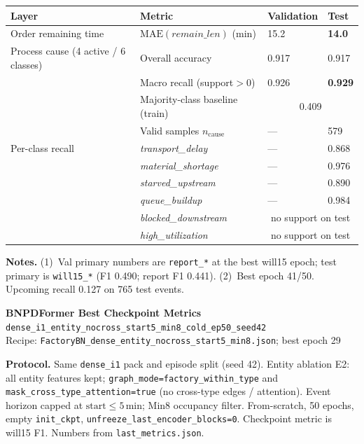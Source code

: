 \documentclass[10pt,a4paper]{article}
\begin{document}
\begin{center}
\begin{tabular}{l l l l}
\toprule
Layer & Metric & Validation & Test \\
\midrule
Order remaining time
  & $\mathrm{MAE}(\textit{remain\_len})$ (min)
  & 15.2
  & \textbf{14.0} \\
\midrule
Process cause (4 active / 6 classes)
  & Overall accuracy
  & 0.917
  & 0.917 \\
  & Macro recall (support${>}0$)
  & 0.926
  & \textbf{0.929} \\
  & Majority-class baseline (train)
  & \multicolumn{2}{c}{0.409} \\
  & Valid samples $n_{\mathrm{cause}}$
  & ---
  & 579 \\
\midrule
Per-class recall
  & \textit{transport\_delay}
  & --- & 0.868 \\
  & \textit{material\_shortage}
  & --- & 0.976 \\
  & \textit{starved\_upstream}
  & --- & 0.890 \\
  & \textit{queue\_buildup}
  & --- & 0.984 \\
  & \textit{blocked\_downstream}
  & \multicolumn{2}{c}{no support on test} \\
  & \textit{high\_utilization}
  & \multicolumn{2}{c}{no support on test} \\
\bottomrule
\end{tabular}
\end{center}

\small
\textbf{Notes.}
(1)~Val primary numbers are \texttt{report\_*} at the best will15 epoch; test primary is \texttt{will15\_*} (F1 0.490; report F1 0.441).
(2)~Best epoch 41/50. Upcoming recall 0.127 on 765 test events.

\clearpage
\begin{center}
{\LARGE\bfseries BNPDFormer Best Checkpoint Metrics}\\[3pt]
{\large\texttt{dense\_i1\_entity\_nocross\_start5\_min8\_cold\_ep50\_seed42}}\\[2pt]
{\normalsize Recipe: \texttt{FactoryBN\_dense\_entity\_nocross\_start5\_min8.json}; best epoch 29}
\end{center}

\textbf{Protocol.}
Same \texttt{dense\_i1} pack and episode split (seed 42).
Entity ablation E2: all entity features kept; \texttt{graph\_mode=factory\_within\_type} and \texttt{mask\_cross\_type\_attention=true} (no cross-type edges / attention).
Event horizon capped at $\mathrm{start}\le 5$\,min; Min8 occupancy filter.
From-scratch, 50 epochs, empty \texttt{init\_ckpt}, \texttt{unfreeze\_last\_encoder\_blocks=0}.
Checkpoint metric is will15 F1.
Numbers from \texttt{last\_metrics.json}.
\end{document}
